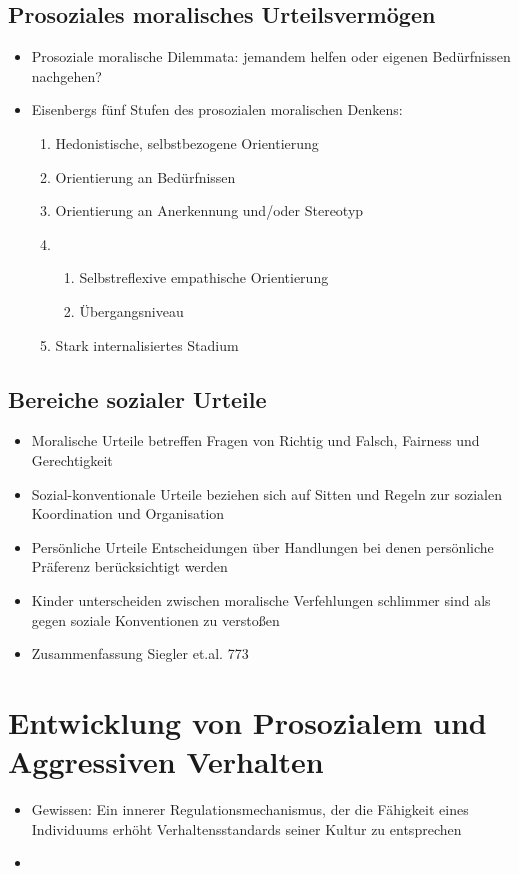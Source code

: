 \subsection{Prosoziales moralisches Urteilsvermögen}
\begin{itemize}
	\item
		Prosoziale moralische Dilemmata: jemandem helfen oder eigenen Bedürfnissen nachgehen?
	\item
		Eisenbergs fünf Stufen des prosozialen moralischen Denkens:
		\begin{enumerate}
			\item
				Hedonistische, selbstbezogene Orientierung
			\item
				Orientierung an Bedürfnissen
			\item
				Orientierung an Anerkennung und/oder Stereotyp
			\item
				\begin{enumerate}
					\item
						Selbstreflexive empathische Orientierung
					\item
						Übergangsniveau
			\end{enumerate}
		\item
			Stark internalisiertes Stadium

	\end{enumerate}
\end{itemize}

\subsection{Bereiche sozialer Urteile}
\begin{itemize}
	\item
		Moralische Urteile betreffen Fragen von Richtig und Falsch, Fairness und Gerechtigkeit
	\item
		Sozial-konventionale Urteile beziehen sich auf Sitten und Regeln zur sozialen Koordination und Organisation
	\item
		Persönliche Urteile Entscheidungen über Handlungen bei denen persönliche Präferenz berücksichtigt werden
	\item
		Kinder unterscheiden zwischen moralische Verfehlungen schlimmer sind als gegen soziale Konventionen zu verstoßen
	\item
		Zusammenfassung Siegler et.al. 773
\end{itemize}

\section{Entwicklung von Prosozialem und Aggressiven Verhalten}
\begin{itemize}
	\item
		Gewissen: Ein innerer Regulationsmechanismus, der die Fähigkeit eines Individuums erhöht Verhaltensstandards seiner Kultur zu entsprechen
	\item

\end{itemize}
